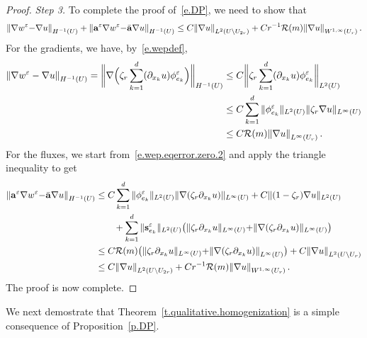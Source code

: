 \documentclass[11pt]{article} %
\numberwithin{equation}{section}
\theoremstyle{definition}
\let\originalleft\left
\let\originalright\right
\renewcommand{\left}{\mathopen{}\mathclose\bgroup\originalleft}
\renewcommand{\right}{\aftergroup\egroup\originalright}
\newcommand{\eps}{\varepsilon}
\newcommand{\s}{\mathbf{s}}
\newcommand{\ep}{\eps}
\renewcommand{\a}{\mathbf{a}}
\newcommand{\ahom}{\bar{\a}}
\begin{document}
\begin{proof}
\emph{Step 3.} To complete the proof of~\eqref{e.DP},
we need to show that 
\begin{equation*}
\left\| \nabla w^\ep {-} \nabla u  \right\|_{H^{-1} (U)}
+ \left\| \a^\ep \nabla w^\ep {-} \ahom \nabla u \right\|_{H^{-1}(U)} 
\leq 
C \left\| \nabla u \right\|_{L^{2}(U \setminus U_{2r})} 
+
C r^{- 1}  \mathcal{R}(m) 
\left\|  \nabla u   \right\|_{W^{1,\infty}(U_r)} 
\,.
\end{equation*}
For the gradients, we have, by~\eqref{e.wepdef},  
\begin{align*}
\left\| \nabla w^\ep - \nabla u  \right\|_{H^{-1} (U)}
=
\biggl\|  
\nabla \Bigl( \zeta_r \sum_{k=1}^d (\partial_{x_k}u) \phi_{e_k}^\ep \Bigr)
\biggr\|_{H^{-1} (U)}
& 
\leq
C
\biggl\|  \zeta_r \sum_{k=1}^d (\partial_{x_k}u) \phi_{e_k}^\ep 
\biggr\|_{L^2(U)}
\\ & 
\leq 
C \sum_{k=1}^d
\| \phi_{e_k}^\ep \|_{L^2(U)}
\| \zeta_r \nabla u \|_{L^\infty(U)}
\\ &
\leq 
C \mathcal{R}(m) \left\| \nabla u \right\|_{L^\infty (U_r)}
\,.
\end{align*}
For the fluxes, we start from~\eqref{e.wep.eqerror.zero.2} and apply the triangle inequality to get 
\begin{align*}
\left\| \a^\ep \nabla w^\ep {-} \ahom \nabla u \right\|_{H^{-1} (U)}
& 
\leq
C \sum_{k=1}^d \| \phi_{e_k}^\ep \|_{L^2(U)} \| \nabla (\zeta_r \partial_{x_k} u) \|_{L^\infty(U)}
+
C \| (1-\zeta_r) \nabla u \|_{L^2(U)} 
\notag \\  &
\qquad + \sum_{k=1}^d 
\| \s_{e_k}^\ep \|_{L^2(U)} \left( \|  \zeta_r \partial_{x_k} u \|_{L^\infty(U)}
{+}
\| \nabla( \zeta_r \partial_{x_k} u ) \|_{L^\infty(U)}
\right)
\\ & 
\leq 
C \mathcal{R}(m)\bigl(  \|  \zeta_r \partial_{x_k} u \|_{L^\infty(U)}
{+}  \left\| \nabla (\zeta_r \partial_{x_k} u) \right\|_{L^\infty(U)} \bigr)
+
C \left\| \nabla u \right\|_{L^2(U \setminus U_{r})}
\\ &
\leq 
C \left\| \nabla u \right\|_{L^{2}(U \setminus U_{2r})} 
+
C r^{- 1}  \mathcal{R}(m) 
\left\|  \nabla u   \right\|_{W^{1,\infty}(U_r)} 
\,.
\end{align*}
The proof is now complete. 
\end{proof}


We next demostrate that Theorem~\ref{t.qualitative.homogenization} is a simple consequence of Proposition~\ref{p.DP}. 
\end{document}
